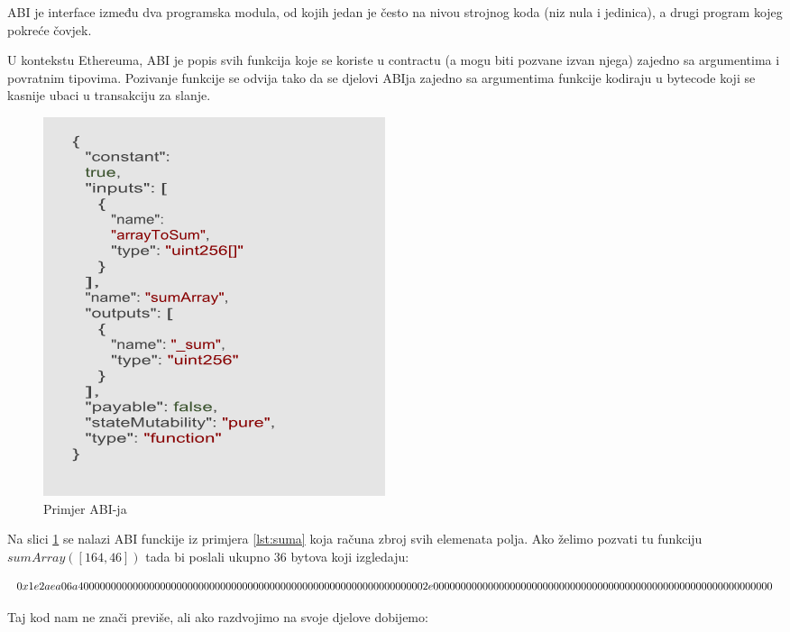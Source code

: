 \documentclass[12pt]{report}
\begin{document}
\begin{definicija}
ABI je interface između dva programska modula, od kojih jedan je često na nivou strojnog koda (niz nula i jedinica), a drugi program kojeg pokreće čovjek.
\end{definicija}

U kontekstu Ethereuma, ABI je popis svih funkcija koje se koriste u contractu (a mogu biti pozvane izvan njega) zajedno sa argumentima i povratnim tipovima. Pozivanje funkcije se odvija tako da se djelovi ABIja zajedno sa argumentima funkcije kodiraju u bytecode koji se kasnije ubaci u transakciju za slanje.

\begin{figure}[!]
\centering
\includegraphics[scale=0.7]{abi}
\caption{Primjer ABI-ja}
\label{fig:abi}
\end{figure}

Na slici \ref{fig:abi} se nalazi ABI funckije iz primjera \ref{lst:suma} koja računa zbroj svih elemenata polja. Ako želimo pozvati tu funkciju $sumArray([164, 46])$ tada bi poslali ukupno 36 bytova koji izgledaju: 


\begin{dmath}
\label{eq:sumabi}
    0x1e2aea06a40000000000000000000000000000000000000000000\\00000000000000000002e000000000000000000000000000000000\\00000000000000000000000000000
\end{dmath}

Taj kod nam ne znači previše, ali ako razdvojimo na svoje djelove dobijemo: 
\end{document}
